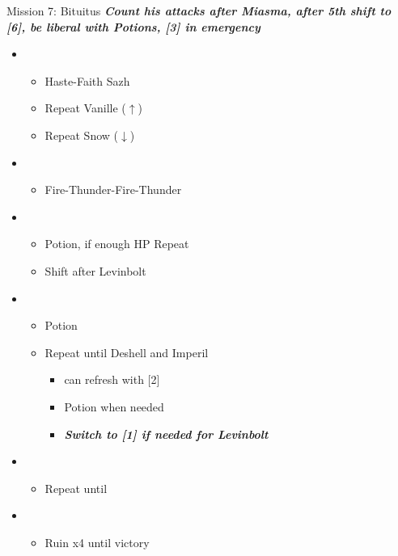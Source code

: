 \begin{battle}{Mission 7: Bituitus}
	\textit{\textbf{Count his attacks after Miasma, after 5th shift to [6], be liberal with Potions, [3] in emergency}}
	\begin{itemize}
		\item \third
			\begin{itemize}
				\item Haste-Faith Sazh
				\item Repeat Vanille ($\uparrow$)
				\item Repeat Snow ($\downarrow$)
			\end{itemize}
		\item \fourth
			\begin{itemize}
				\item Fire-Thunder-Fire-Thunder
			\end{itemize}
		\item \first
			\begin{itemize}
				\item Potion, if enough HP Repeat
				\item Shift after Levinbolt
			\end{itemize}
		\item \fourth
			\begin{itemize}
				\item Potion
				\item Repeat until Deshell and Imperil
					\begin{itemize}
						\item can refresh with [2]
						\item Potion when needed
						\item \textbf{\textit{Switch to [1] if needed for Levinbolt}}
					\end{itemize}
			\end{itemize}
		\item \second
			\begin{itemize}
				\item Repeat until \stagger
			\end{itemize}
		\item \fifth
			\begin{itemize}
				\item Ruin x4 until victory
			\end{itemize}
	\end{itemize}
\end{battle}

